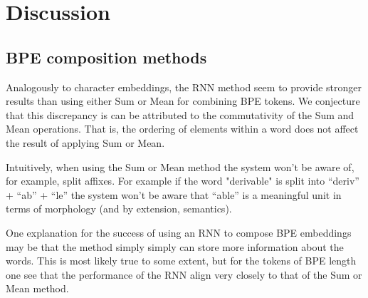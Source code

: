 \documentclass[11pt]{article}
\newcommand\jp[1]{(\textbf{JP:} #1)}
\begin{document}
\begin{figure}
	\end{figure}

	
	
	\section{Discussion}

    \subsection{BPE composition methods}
     Analogously to character embeddings, the RNN method seem
     to provide stronger results than using either Sum or Mean for
     combining BPE tokens. We conjecture that this discrepancy is can
     be attributed to the commutativity of the Sum and Mean
     operations. That is, the ordering of elements within a word does
     not affect the result of applying Sum or Mean.

     Intuitively, when using the Sum or Mean method the system won't
     be aware of, for example, split affixes. For example if the word
     "derivable" is split into ``deriv'' + ``ab'' + ``le'' the system
     won't be aware that ``able'' is a meaningful unit in terms of
     morphology (and by extension, semantics).


     One explanation for the success of using an RNN to compose BPE
     embeddings may be that the method simply simply can store more
     information about the words. This is most likely true to some
     extent, but for the tokens of BPE length one see that the
     performance of the RNN align very closely to that of the Sum or
     Mean method.
\end{document}
